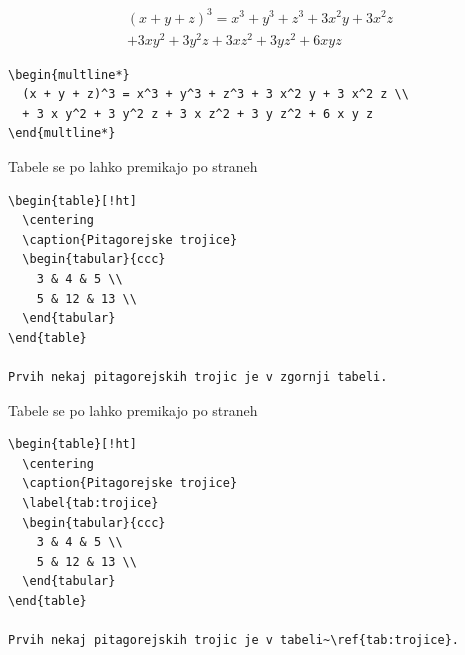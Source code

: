 \documentclass[aspectratio=169]{beamer}
\begin{document}
\begin{frame}[fragile]{}
  \begin{multline*}
    (x + y + z)^3 = x^3 + y^3 + z^3 + 3 x^2 y + 3 x^2 z \\
    + 3 x y^2 + 3 y^2 z + 3 x z^2 + 3 y z^2 + 6 x y z
  \end{multline*}

  \begin{verbatim}
\begin{multline*}
  (x + y + z)^3 = x^3 + y^3 + z^3 + 3 x^2 y + 3 x^2 z \\
  + 3 x y^2 + 3 y^2 z + 3 x z^2 + 3 y z^2 + 6 x y z
\end{multline*}
  \end{verbatim}
\end{frame}

\begin{frame}[fragile]{Tabele se po lahko premikajo po straneh}

  \begin{slaboenv}
    \begin{verbatim}
\begin{table}[!ht]
  \centering
  \caption{Pitagorejske trojice}
  \begin{tabular}{ccc}
    3 & 4 & 5 \\
    5 & 12 & 13 \\
  \end{tabular}
\end{table}

Prvih nekaj pitagorejskih trojic je v zgornji tabeli.
    \end{verbatim}
  \end{slaboenv}

\end{frame}

\begin{frame}[fragile]{Tabele se po lahko premikajo po straneh}

  \begin{dobroenv}
    \begin{verbatim}
\begin{table}[!ht]
  \centering
  \caption{Pitagorejske trojice}
  \label{tab:trojice}
  \begin{tabular}{ccc}
    3 & 4 & 5 \\
    5 & 12 & 13 \\
  \end{tabular}
\end{table}

Prvih nekaj pitagorejskih trojic je v tabeli~\ref{tab:trojice}.
    \end{verbatim}
  \end{dobroenv}

\end{frame}
\end{document}
